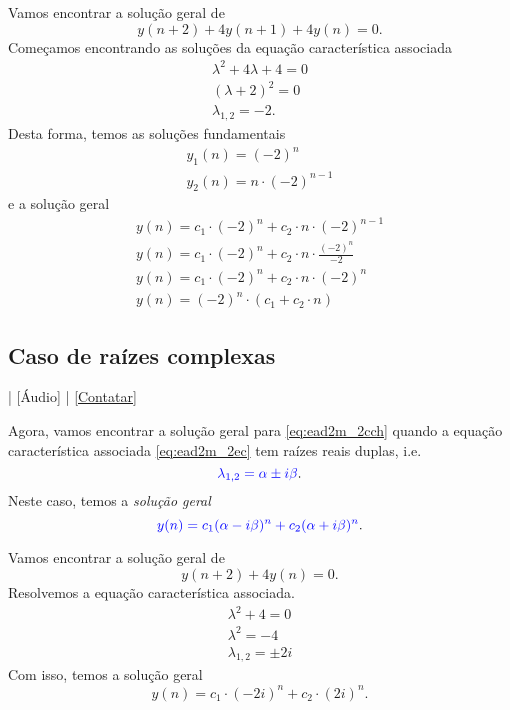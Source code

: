 \begin{ex}
  Vamos encontrar a solução geral de
  \begin{equation}
    y(n+2)+4y(n+1)+4y(n)=0.
  \end{equation}
  Começamos encontrando as soluções da equação característica associada
  \begin{gather}
    \lambda^2 + 4\lambda + 4 = 0\\
    (\lambda+2)^2 = 0 \\
    \lambda_{1,2} = -2.
  \end{gather}
  Desta forma, temos as soluções fundamentais
  \begin{gather}
    y_1(n) = (-2)^n\\
    y_2(n) = n\cdot (-2)^{n-1}
  \end{gather}
  e a solução geral
  \begin{gather}
    y(n) = c_1\cdot (-2)^n + c_2\cdot n\cdot (-2)^{n-1}\\
    y(n) = c_1\cdot (-2)^n + c_2\cdot n\cdot \frac{(-2)^n}{-2}\\
    y(n) = c_1\cdot(-2)^n + c_2\cdot n \cdot (-2)^n\\
    y(n) = (-2)^n\cdot \left(c_1 + c_2\cdot n\right)
  \end{gather}
\end{ex}

\subsection{Caso de raízes complexas}

\begin{flushright}
  [Vídeo] | [Áudio] | \href{https://phkonzen.github.io/notas/contato.html}{[Contatar]}
\end{flushright}

Agora, vamos encontrar a solução geral para \eqref{eq:ead2m_2cch} quando a equação característica associada \eqref{eq:ead2m_2ec} tem raízes reais duplas, i.e.
\begin{equation}
  {\color{blue}\lambda_{1,2} = \alpha \pm i\beta}.
\end{equation}
Neste caso, temos a \emph{solução geral}
\begin{equation}
  {\color{blue}y(n) = c_1(\alpha-i\beta)^n + c_2(\alpha + i\beta)^n}.
\end{equation}

\begin{ex}
  Vamos encontrar a solução geral de
  \begin{equation}
    y(n+2) + 4y(n) = 0.
  \end{equation}
  Resolvemos a equação característica associada.
  \begin{gather}
    \lambda^2 + 4 = 0\\
    \lambda^2 = -4 \\
    \lambda_{1,2} = \pm 2i
  \end{gather}
  Com isso, temos a solução geral
  \begin{equation}
    y(n) = c_1\cdot (-2i)^n + c_2\cdot (2i)^n.
  \end{equation}
\end{ex}


